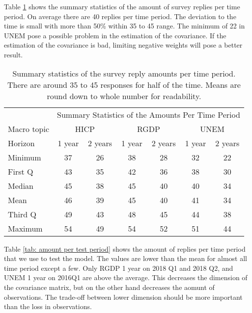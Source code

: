 \documentclass[11pt]{article}
\begin{document}
Table \ref{tab: time summary statistics} shows the summary statistics of the amount of survey replies per time period. On average there are 40 replies per time period. The deviation to the time is small with more than 50\% within 35 to 45 range. The minimum of 22 in UNEM pose a possible problem in the estimation of the covariance. If the estimation of the covariance is bad, limiting negative weights will pose a better result.

\begin{table}[!h]
	\centering
	\caption{Summary statistics of the survey reply amounts per time period. There are around 35 to 45 responses for half of the time. Means are round down to whole number for readability.}
	\label{tab: time summary statistics}
	\begin{tabular}{lcccccc}%
		\hline
		&\multicolumn{6}{c}{Summary Statistics of the Amounts Per Time Period}\\
		\cmidrule(lr){2-7}
		Macro topic & \multicolumn{2}{c}{HICP} & \multicolumn{2}{c}{RGDP} & \multicolumn{2}{c}{UNEM} \\
		\cmidrule(lr){2-3} \cmidrule(lr){4-5}\cmidrule(lr){6-7}
		Horizon     & 1 year & 2 years & 1 year & 2 years & 1 year & 2 years \\ 
		\hline
Minimum & 37    & 26    & 38    & 28    & 32    & 22    \\
First Q & 43    & 35    & 42    & 36    & 38    & 30    \\
Median  & 45    & 38    & 45    & 40    & 40    & 34    \\
Mean    & 46    & 39    & 45    & 40    & 41    & 34    \\
Third Q & 49    & 43    & 48    & 45    & 44    & 38    \\
Maximum & 54    & 49    & 54    & 52    & 51    & 44       \\ 
		\hline
	\end{tabular}
\end{table}

Table \ref{tab: amount per test period} shows the amount of replies per time period that we use to test the model. The values are lower than the mean for almost all time period except a few. Only RGDP 1 year on 2018 Q1 and 2018 Q2, and UNEM 1 year on 2016Q1 are above the average. This decreases the dimension of the covariance matrix, but on the other hand decreases the aomunt of observations. The trade-off between lower dimension should be more important than the loss in observations.
\end{document}
